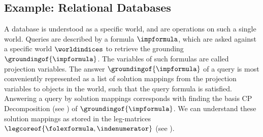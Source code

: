 %

\subsection{Example: Relational Databases}

A database is understood as a specific \firstOrderLogic{} world, and are operations on such a single world.
Queries are described by a formula $\impformula$, which are asked against a specific world $\worldindices$ to retrieve the grounding $\groundingof{\impformula}$.
The variables of such formulas are called projection variables.
The answer $\groundingof{\impformula}$ of a query is most conveniently represented as a list of solution mappings from the projection variables to objects in the world, such that the query formula is satisfied.
Answering a query by solution mappings corresponds with finding the basis CP Decomposition (see ) of $\groundingof{\impformula}$.
We can understand these solution mappings as stored in the leg-matrices $\legcoreof{\folexformula,\indenumerator}$ (see ).

